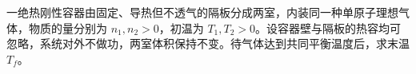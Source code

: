 一绝热刚性容器由固定、导热但不透气的隔板分成两室，内装同一种单原子理想气体，物质的量分别为 $n_1,n_2>0$，初温为 $T_1,T_2>0$。设容器壁与隔板的热容均可忽略，系统对外不做功，两室体积保持不变。待气体达到共同平衡温度后，求末温 $T_f$。
